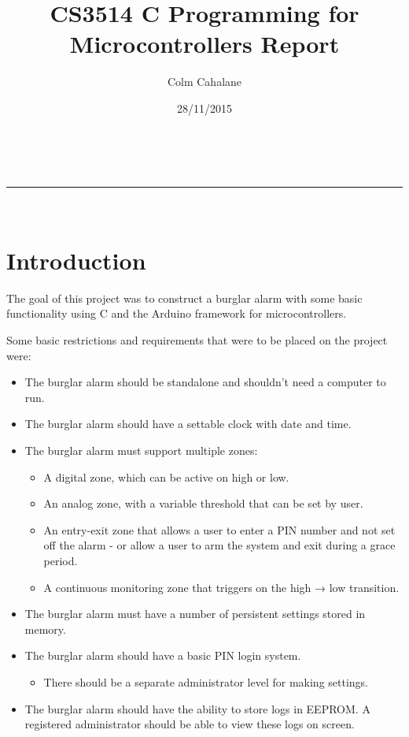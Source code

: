 \documentclass[a4paper,11pt]{article}
\makeatletter
\newcommand{\linia}{\rule{\linewidth}{0.5pt}}
\theoremstyle{mytheor}
\renewcommand{\maketitle}{
\begin{center}
\vspace{2ex}
{\huge \textsc{\@title}}
\vspace{1ex}
\\
\linia\\
\@author \hfill \@date
\vspace{4ex}
\end{center}
}
\makeatother
\begin{document}
\title{CS3514 C Programming for Microcontrollers Report}

\author{Colm Cahalane}

\date{28/11/2015}

\maketitle

\tableofcontents
\newpage

\section{Introduction}

The goal of this project was to construct a burglar alarm with some basic functionality using C and the Arduino framework for microcontrollers.

Some basic restrictions and requirements that were to be placed on the project were:

\begin{itemize}
\item The burglar alarm should be standalone and shouldn't need a computer to run.
\item The burglar alarm should have a settable clock with date and time.
\item The burglar alarm must support multiple zones:
\begin{itemize}
\item A digital zone, which can be active on high or low.
\item An analog zone, with a variable threshold that can be set by user.
\item An entry-exit zone that allows a user to enter a PIN number and not set off the alarm - or allow a user to arm the system and exit during a grace period.
\item A continuous monitoring zone that triggers on the high → low transition.
\end{itemize}
\item The burglar alarm must have a number of persistent settings stored in memory.
\item The burglar alarm should have a basic PIN login system.
\begin{itemize}
\item There should be a separate administrator level for making settings.
\end{itemize}
\item The burglar alarm should have the ability to store logs in EEPROM. A registered administrator should be able to view these logs on screen.
\end{itemize}
\end{document}

